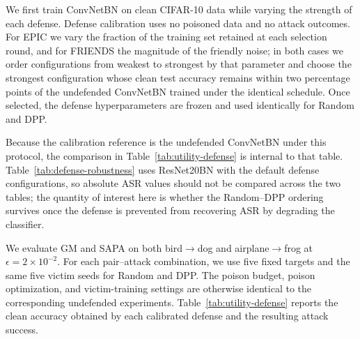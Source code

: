 We first train ConvNetBN on clean CIFAR-10 data while varying the
strength of each defense. Defense calibration uses no poisoned data and
no attack outcomes. For EPIC we vary the fraction of the training set
retained at each selection round, and for FRIENDS the magnitude of the
friendly noise; in both cases we order configurations from weakest to
strongest by that parameter and choose the strongest configuration whose
clean test accuracy remains within two percentage points of the
undefended ConvNetBN trained under the identical schedule. Once selected,
the defense hyperparameters are frozen and used identically for Random
and DPP.

Because the calibration reference is the undefended ConvNetBN under this
protocol, the comparison in Table~\ref{tab:utility-defense} is internal
to that table. Table~\ref{tab:defense-robustness} uses ResNet20BN with
the default defense configurations, so absolute ASR values should not be
compared across the two tables; the quantity of interest here is whether
the Random--DPP ordering survives once the defense is prevented from
recovering ASR by degrading the classifier.

We evaluate GM and SAPA on both bird$\rightarrow$dog and
airplane$\rightarrow$frog at $\epsilon=2\times10^{-2}$. For each
pair--attack combination, we use five fixed targets and the same five
victim seeds for Random and DPP. The poison budget, poison optimization,
and victim-training settings are otherwise identical to the
corresponding undefended experiments. Table~\ref{tab:utility-defense}
reports the clean accuracy obtained by each calibrated defense and the
resulting attack success.

